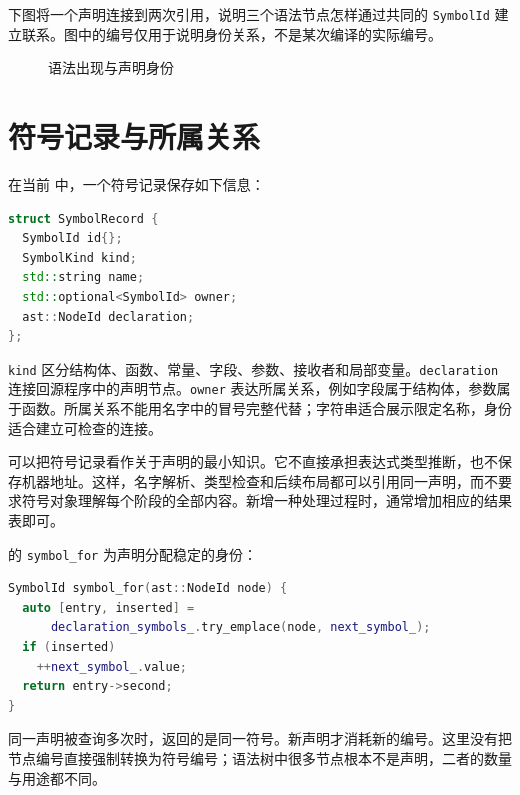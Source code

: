 下图将一个声明连接到两次引用，说明三个语法节点怎样通过共同的 \texttt{SymbolId} 建立联系。图中的编号仅用于说明身份关系，不是某次编译的实际编号。
\begin{figure}[htbp]
\centering
{}
\caption{语法出现与声明身份}
\end{figure}

\section{符号记录与所属关系}
在当前  中，一个符号记录保存如下信息：
\begin{lstlisting}[language=C++]
struct SymbolRecord {
  SymbolId id{};
  SymbolKind kind;
  std::string name;
  std::optional<SymbolId> owner;
  ast::NodeId declaration;
};
\end{lstlisting}
\texttt{kind} 区分结构体、函数、常量、字段、参数、接收者和局部变量。\texttt{declaration} 连接回源程序中的声明节点。\texttt{owner} 表达所属关系，例如字段属于结构体，参数属于函数。所属关系不能用名字中的冒号完整代替；字符串适合展示限定名称，身份适合建立可检查的连接。

可以把符号记录看作关于声明的最小知识。它不直接承担表达式类型推断，也不保存机器地址。这样，名字解析、类型检查和后续布局都可以引用同一声明，而不要求符号对象理解每个阶段的全部内容。新增一种处理过程时，通常增加相应的结果表即可。

 的 \texttt{symbol\_for} 为声明分配稳定的身份：
\begin{lstlisting}[language=C++]
SymbolId symbol_for(ast::NodeId node) {
  auto [entry, inserted] =
      declaration_symbols_.try_emplace(node, next_symbol_);
  if (inserted)
    ++next_symbol_.value;
  return entry->second;
}
\end{lstlisting}
同一声明被查询多次时，返回的是同一符号。新声明才消耗新的编号。这里没有把节点编号直接强制转换为符号编号；语法树中很多节点根本不是声明，二者的数量与用途都不同。


